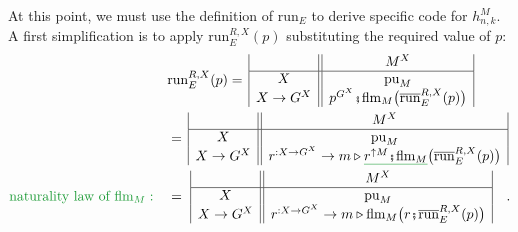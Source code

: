 At this point, we must use the definition of $\text{run}_{E}$ to
derive specific code for $h_{n,k}^{M}$. A first simplification is
to apply $\text{run}_{E}^{R,X}(p)$ substituting the required value
of $p$:
\begin{align*}
 & \text{run}_{E}^{R,X}(p)=\,\begin{array}{|c||c|}
 & M^{X}\\
\hline X & \text{pu}_{M}\\
X\rightarrow G^{X} & p^{G^{X}}\bef\text{flm}_{M}\big(\overline{\text{run}}_{E}^{R,X}(p)\big)
\end{array}\\
 & =\,\begin{array}{|c||c|}
 & M^{X}\\
\hline X & \text{pu}_{M}\\
X\rightarrow G^{X} & r^{:X\rightarrow G^{X}}\rightarrow m\triangleright\gunderline{r^{\uparrow M}\bef\text{flm}_{M}}\big(\overline{\text{run}}_{E}^{R,X}(p)\big)
\end{array}\\
{\color{greenunder}\text{naturality law of }\text{flm}_{M}:}\quad & =\,\,\begin{array}{|c||c|}
 & M^{X}\\
\hline X & \text{pu}_{M}\\
X\rightarrow G^{X} & r^{:X\rightarrow G^{X}}\rightarrow m\triangleright\text{flm}_{M}\big(r\bef\overline{\text{run}}_{E}^{R,X}(p)\big)
\end{array}\quad.
\end{align*}

